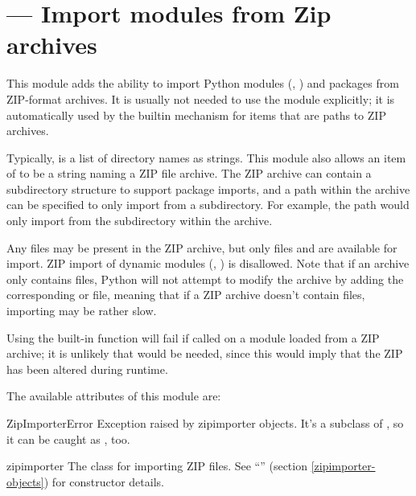 \section{ ---
         Import modules from Zip archives}



This module adds the ability to import Python modules (,
) and packages from ZIP-format archives. It is usually
not needed to use the  module explicitly; it is
automatically used by the builtin  mechanism for
 items that are paths to ZIP archives.

Typically,  is a list of directory names as strings.  This
module also allows an item of  to be a string naming a ZIP
file archive. The ZIP archive can contain a subdirectory structure to
support package imports, and a path within the archive can be specified to
only import from a subdirectory.  For example, the path
 would only import from the
 subdirectory within the archive.

Any files may be present in the ZIP archive, but only files  and
 are available for import.  ZIP import of dynamic modules
(, ) is disallowed. Note that if an archive only
contains  files, Python will not attempt to modify the archive
by adding the corresponding  or  file, meaning that
if a ZIP archive doesn't contain  files, importing may be rather
slow.

Using the built-in  function will
fail if called on a module loaded from a ZIP archive; it is unlikely that
 would be needed, since this would imply that the ZIP
has been altered during runtime.

The available attributes of this module are:

\begin{excdesc}{ZipImporterError}
  Exception raised by zipimporter objects. It's a subclass of
  , so it can be caught as ,
  too.
\end{excdesc}

\begin{classdesc*}{zipimporter}
  The class for importing ZIP files.  See
  ``'' (section \ref{zipimporter-objects})
  for constructor details.
\end{classdesc*}



